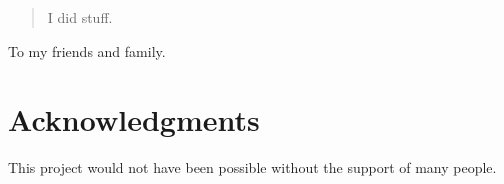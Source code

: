 \frontmatter

\begin{abstract}
I did stuff.
\end{abstract}

\begin{dedication}
To my friends and family.
\end{dedication}

\chapter*{Acknowledgments}
This project would not have been possible without the support of many people.